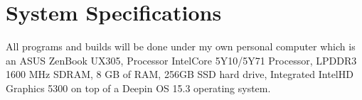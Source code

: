 


\section{System Specifications}

All programs and builds will be done under my own personal computer which is an ASUS ZenBook UX305, Processor Intel\textregistered Core \texttrademark 5Y10/5Y71 Processor, LPDDR3 1600 MHz SDRAM, 8 GB of RAM, 256GB SSD hard drive, Integrated Intel\textregistered HD Graphics 5300 on top of a Deepin OS 15.3 operating system.




